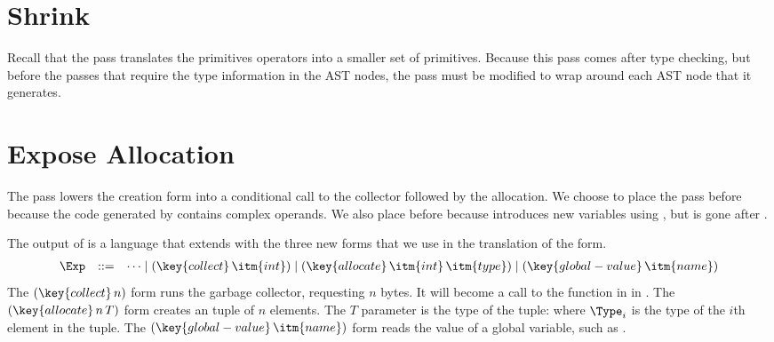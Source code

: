 \documentclass[11pt]{book}
\begin{document}
\section{Shrink}
\label{sec:shrink-Rvec}

Recall that the  pass translates the primitives operators
into a smaller set of primitives. Because this pass comes after type
checking, but before the passes that require the type information in
the  AST nodes, the  pass must be modified
to wrap  around each AST node that it generates.


\section{Expose Allocation}
\label{sec:expose-allocation}

The pass  lowers the  creation
form into a conditional call to the collector followed by the
allocation.  We choose to place the  pass
before  because the code generated by
 contains complex operands.  We also place
 before  because
 introduces new variables using ,
but  is gone after .

The output of  is a language \LangAlloc{} that
extends \LangVec{} with the three new forms that we use in the translation
of the  form.
\[
\begin{array}{lcl}
  \Exp &::=& \cdots
      \mid (\key{collect} \,\itm{int})
      \mid (\key{allocate} \,\itm{int}\,\itm{type})
      \mid (\key{global-value} \,\itm{name})
\end{array}
\]
The $(\key{collect}\,n)$ form runs the garbage collector, requesting
$n$ bytes. It will become a call to the  function in
 in .  The
$(\key{allocate}\,n\,T)$ form creates an tuple of $n$ elements.
The $T$ parameter is the type of the tuple:  where $\Type_i$ is the type of the $i$th element in the
tuple. The $(\key{global-value}\,\itm{name})$ form reads the value of
a global variable, such as .
\end{document}
